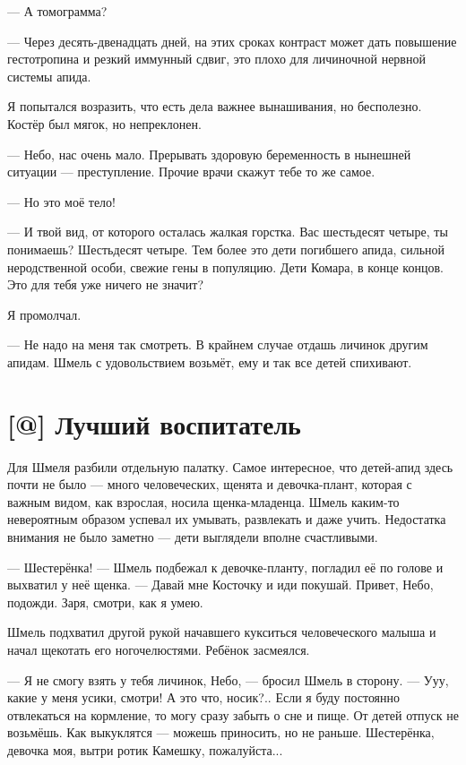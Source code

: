 --- А томограмма?

--- Через десять-двенадцать дней, на этих сроках контраст может дать повышение гестотропина и резкий иммунный сдвиг, это плохо для личиночной нервной системы апида.

Я попытался возразить, что есть дела важнее вынашивания, но бесполезно.
Костёр был мягок, но непреклонен.

--- Небо, нас очень мало.
Прерывать здоровую беременность в нынешней ситуации --- преступление.
Прочие врачи скажут тебе то же самое.

--- Но это моё тело!

--- И твой вид, от которого осталась жалкая горстка.
Вас шестьдесят четыре, ты понимаешь?
Шестьдесят четыре.
Тем более это дети погибшего апида, сильной неродственной особи, свежие гены в популяцию.
Дети Комара, в конце концов.
Это для тебя уже ничего не значит?

Я промолчал.

--- Не надо на меня так смотреть.
В крайнем случае отдашь личинок другим апидам.
Шмель с удовольствием возьмёт, ему и так все детей спихивают.

\section{[@] Лучший воспитатель}

Для Шмеля разбили отдельную палатку.
Самое интересное, что детей-апид здесь почти не было --- много человеческих, щенята и девочка-плант, которая с важным видом, как взрослая, носила щенка-младенца.
Шмель каким-то невероятным образом успевал их умывать, развлекать и даже учить.
Недостатка внимания не было заметно --- дети выглядели вполне счастливыми.

--- Шестерёнка! --- Шмель подбежал к девочке-планту, погладил её по голове и выхватил у неё щенка.
--- Давай мне Косточку и иди покушай.
Привет, Небо, подожди.
Заря, смотри, как я умею.

Шмель подхватил другой рукой начавшего кукситься человеческого малыша и начал щекотать его ногочелюстями.
Ребёнок засмеялся.

--- Я не смогу взять у тебя личинок, Небо, --- бросил Шмель в сторону.
--- Ууу, какие у меня усики, смотри!
А это что, носик?..
Если я буду постоянно отвлекаться на кормление, то могу сразу забыть о сне и пище.
От детей отпуск не возьмёшь.
Как выкуклятся --- можешь приносить, но не раньше.
Шестерёнка, девочка моя, вытри ротик Камешку, пожалуйста...

